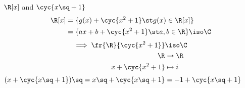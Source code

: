\begin{example}
  \( \R[x] \) and \( \cyc{x\sq+1} \)
  \begin{align*}
    \R[x] &= \{ g(x) + \cyc{x^2+1} \st g(x)\in \R[x] \} \\
          &= \{ ax+b + \cyc{x^2+1} \st a,b\in \R \} \iso \C
  \end{align*}
  \begin{align*}
    \implies \fr{\R}{\cyc{x^2+1}}&\iso\C \\
    \R &\to \R \\
    x+\cyc{x^2+1} &\mapsto i
  \end{align*}
  \( (x+\cyc{x\sq +1})\sq = x\sq + \cyc{x\sq+1} = -1+\cyc{x\sq+1} \)
\end{example}